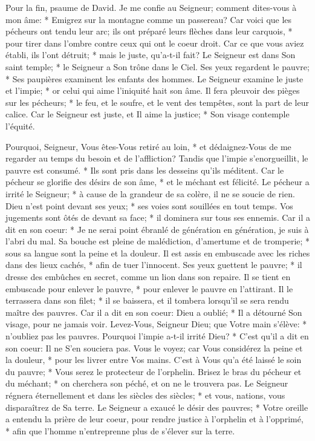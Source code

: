 Pour la fin, psaume de David.
Je me confie au Seigneur; comment dites-vous à mon âme: * Emigrez sur la montagne comme un passereau?
Car voici que les pécheurs ont tendu leur arc; ils ont préparé leurs flèches dans leur carquois, * pour tirer dans l'ombre contre ceux qui ont le coeur droit.
Car ce que vous aviez établi, ils l'ont détruit; * mais le juste, qu'a-t-il fait?
Le Seigneur est dans Son saint temple; * le Seigneur a Son trône dans le Ciel. Ses yeux regardent le pauvre; * Ses paupières examinent les enfants des hommes.
Le Seigneur examine le juste et l'impie; * or celui qui aime l'iniquité hait son âme.
Il fera pleuvoir des pièges sur les pécheurs; * le feu, et le soufre, et le vent des tempêtes, sont la part de leur calice.
Car le Seigneur est juste, et Il aime la justice; * Son visage contemple l'équité.

Pourquoi, Seigneur, Vous êtes-Vous retiré au loin, * et dédaignez-Vous de me regarder au temps du besoin et de l'affliction?
Tandis que l'impie s'enorgueillit, le pauvre est consumé. * Ils sont pris dans les desseins qu'ils méditent.
Car le pécheur se glorifie des désirs de son âme, * et le méchant est félicité.
Le pécheur a irrité le Seigneur; * à cause de la grandeur de sa colère, il ne se soucie de rien.
Dieu n'est point devant ses yeux; * ses voies sont souillées en tout temps. Vos jugements sont ôtés de devant sa face; * il dominera sur tous ses ennemis.
Car il a dit en son coeur: * Je ne serai point ébranlé de génération en génération, je suis à l'abri du mal.
Sa bouche est pleine de malédiction, d'amertume et de tromperie; * sous sa langue sont la peine et la douleur.
Il est assis en embuscade avec les riches dans des lieux cachés, * afin de tuer l'innocent.
Ses yeux guettent le pauvre; * il dresse des embûches en secret, comme un lion dans son repaire. Il se tient en embuscade pour enlever le pauvre, * pour enlever le pauvre en l'attirant.
Il le terrassera dans son filet; * il se baissera, et il tombera lorsqu'il se sera rendu maître des pauvres.
Car il a dit en son coeur: Dieu a oublié; * Il a détourné Son visage, pour ne jamais voir.
Levez-Vous, Seigneur Dieu; que Votre main s'élève: * n'oubliez pas les pauvres.
Pourquoi l'impie a-t-il irrité Dieu? * C'est qu'il a dit en son coeur: Il ne S'en souciera pas.
Vous le voyez; car Vous considérez la peine et la douleur, * pour les livrer entre Vos mains. C'est à Vous qu'a été laissé le soin du pauvre; * Vous serez le protecteur de l'orphelin.
Brisez le bras du pécheur et du méchant; * on cherchera son péché, et on ne le trouvera pas.
Le Seigneur régnera éternellement et dans les siècles des siècles; * et vous, nations, vous disparaîtrez de Sa terre.
Le Seigneur a exaucé le désir des pauvres; * Votre oreille a entendu la prière de leur coeur,
pour rendre justice à l'orphelin et à l'opprimé, * afin que l'homme n'entreprenne plus de s'élever sur la terre.

